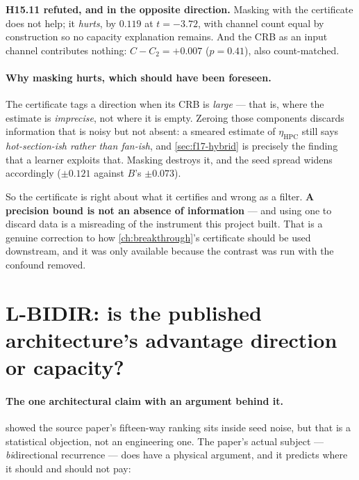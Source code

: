\textbf{H15.11 refuted, and in the opposite direction.} Masking with the certificate does not
help; it \emph{hurts}, by $0.119$ at $t = -3.72$, with channel count equal by construction so
no capacity explanation remains. And the CRB as an input channel contributes nothing:
$C - C_2 = +0.007$ ($p = 0.41$), also count-matched.


\paragraph{Why masking hurts, which should have been foreseen.} The certificate tags a direction
 when its CRB is \emph{large} --- that is, where the estimate is
\emph{imprecise}, not where it is empty. Zeroing those components discards information that is
noisy but not absent: a smeared estimate of $\eta_{\mathrm{HPC}}$ still says \emph{hot-section-ish
rather than fan-ish}, and \cref{sec:f17-hybrid} is precisely the finding that a learner exploits
that. Masking destroys it, and the seed spread widens accordingly ($\pm0.121$ against $B$'s
$\pm0.073$).

So the certificate is right about what it certifies and wrong as a filter. \textbf{A precision
bound is not an absence of information} --- and using one to discard data is a misreading of the
instrument this project built. That is a genuine correction to how \cref{ch:breakthrough}'s
certificate should be used downstream, and it was only available because the contrast was run
with the confound removed.

\section{L-BIDIR: is the published architecture's advantage direction or capacity?}
\label{sec:f18-bidir}

\paragraph{The one architectural claim with an argument behind it.}
 showed the source paper's fifteen-way ranking sits inside seed noise, but
that is a statistical objection, not an engineering one. The paper's actual subject ---
\emph{bi}directional recurrence --- does have a physical argument, and it predicts where it
should and should not pay:

